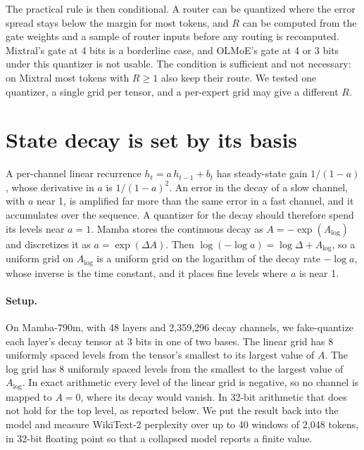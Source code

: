 \documentclass[10pt]{article}
\begin{document}
The practical rule is then conditional. A router can be quantized where the error spread stays
below the margin for most tokens, and $R$ can be computed from the gate weights and a sample of
router inputs before any routing is recomputed. Mixtral's gate at 4 bits is a borderline case, and
OLMoE's gate at 4 or 3 bits under this quantizer is not usable. The condition is sufficient and
not necessary: on Mixtral most tokens with $R \geq 1$ also keep their route. We tested one
quantizer, a single grid per tensor, and a per-expert grid may give a different $R$.

\section{State decay is set by its basis}\label{sec:decay}

A per-channel linear recurrence $h_t = a\,h_{t-1} + b_t$ has steady-state gain $1/(1-a)$, whose
derivative in $a$ is $1/(1-a)^2$. An error in the decay of a slow channel, with $a$ near 1, is
amplified far more than the same error in a fast channel, and it accumulates over the sequence. A
quantizer for the decay should therefore spend its levels near $a = 1$. Mamba \citep{gu2024mamba}
stores the continuous decay as $A = -\exp(A_{\log})$ and discretizes it as $a = \exp(\Delta A)$.
Then $\log(-\log a) = \log\Delta + A_{\log}$, so a uniform grid on $A_{\log}$ is a uniform grid on
the logarithm of the decay rate $-\log a$, whose inverse is the time constant, and it places fine
levels where $a$ is near 1.

\paragraph{Setup.} On Mamba-790m, with 48 layers and 2{,}359{,}296 decay channels, we
fake-quantize each layer's decay tensor at 3 bits in one of two bases. The linear grid has 8
uniformly spaced levels from the tensor's smallest to its largest value of $A$. The log grid has 8
uniformly spaced levels from the smallest to the largest value of $A_{\log}$. In exact arithmetic every
level of the linear grid is negative, so no channel is mapped to $A = 0$, where its decay would
vanish. In 32-bit arithmetic that does not hold for the top level, as reported below.
We put the result back into the model and measure WikiText-2 perplexity over up to 40 windows of
2{,}048 tokens, in 32-bit floating point so that a collapsed model reports a finite value.
\end{document}

